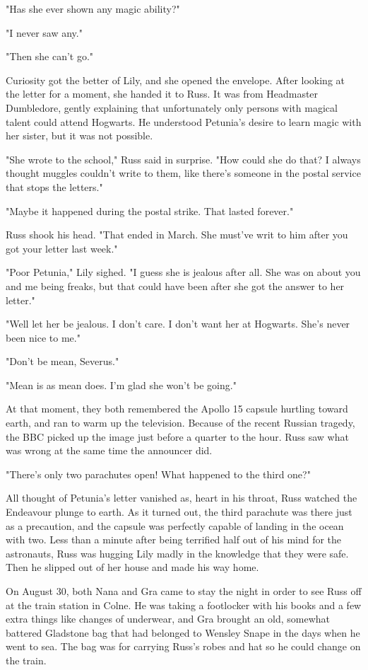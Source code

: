 "Has she ever shown any magic ability?"

"I never saw any."

"Then she can't go."

Curiosity got the better of Lily, and she opened the envelope. After looking at the letter for a moment, she handed it to Russ. It was from Headmaster Dumbledore, gently explaining that unfortunately only persons with magical talent could attend Hogwarts. He understood Petunia's desire to learn magic with her sister, but it was not possible.

"She wrote to the school," Russ said in surprise. "How could she do that? I always thought muggles couldn't write to them, like there's someone in the postal service that stops the letters."

"Maybe it happened during the postal strike. That lasted forever."

Russ shook his head. "That ended in March. She must've writ to him after you got your letter last week."

"Poor Petunia," Lily sighed. "I guess she is jealous after all. She was on about you and me being freaks, but that could have been after she got the answer to her letter."

"Well let her be jealous. I don't care. I don't want her at Hogwarts. She's never been nice to me."

"Don't be mean, Severus."

"Mean is as mean does. I'm glad she won't be going."

At that moment, they both remembered the Apollo 15 capsule hurtling toward earth, and ran to warm up the television. Because of the recent Russian tragedy, the BBC picked up the image just before a quarter to the hour. Russ saw what was wrong at the same time the announcer did.

"There's only two parachutes open! What happened to the third one?"

All thought of Petunia's letter vanished as, heart in his throat, Russ watched the Endeavour plunge to earth. As it turned out, the third parachute was there just as a precaution, and the capsule was perfectly capable of landing in the ocean with two. Less than a minute after being terrified half out of his mind for the astronauts, Russ was hugging Lily madly in the knowledge that they were safe. Then he slipped out of her house and made his way home.

On August 30, both Nana and Gra came to stay the night in order to see Russ off at the train station in Colne. He was taking a footlocker with his books and a few extra things like changes of underwear, and Gra brought an old, somewhat battered Gladstone bag that had belonged to Wensley Snape in the days when he went to sea. The bag was for carrying Russ's robes and hat so he could change on the train.

